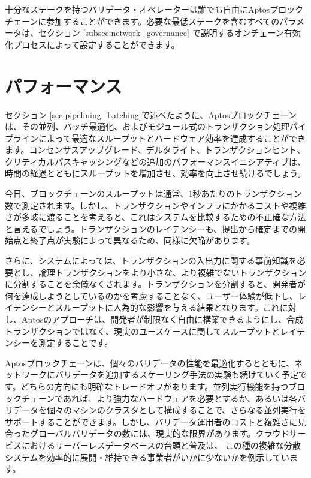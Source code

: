 \documentclass{article}
\begin{document}
十分なステークを持つバリデータ・オペレーターは誰でも自由にAptosブロックチェーンに参加することができます。必要な最低ステークを含むすべてのパラメータは、セクション \ref{subsec:network_governance} で説明するオンチェーン有効化プロセスによって設定することができます。

\section{パフォーマンス}
\label{sec:performance}

セクション \ref{sec:pipelining_batching}で述べたように、Aptosブロックチェーンは、その並列、バッチ最適化、およびモジュール式のトランザクション処理パイプラインによって最適なスループットとハードウェア効率を達成することができます。コンセンサスアップグレード、デルタライト、トランザクションヒント、クリティカルパスキャッシングなどの追加のパフォーマンスイニシアティブは、時間の経過とともにスループットを増加させ、効率を向上させ続けるでしょう。

今日、ブロックチェーンのスループットは通常、1秒あたりのトランザクション数で測定されます。しかし、トランザクションやインフラにかかるコストや複雑さが多岐に渡ることを考えると、これはシステムを比較するための不正確な方法と言えるでしょう。トランザクションのレイテンシーも、提出から確定までの開始点と終了点が実験によって異なるため、同様に欠陥があります。

さらに、システムによっては、トランザクションの入出力に関する事前知識を必要とし、論理トランザクションをより小さな、より複雑でないトランザクションに分割することを余儀なくされます。トランザクションを分割すると、開発者が何を達成しようとしているのかを考慮することなく、ユーザー体験が低下し、レイテンシーとスループットに人為的な影響を与える結果となります。これに対し、Aptosのアプローチは、開発者が制限なく自由に構築できるようにし、合成トランザクションではなく、現実のユースケースに関してスループットとレイテンシーを測定することです。

Aptosブロックチェーンは、個々のバリデータの性能を最適化するとともに、ネットワークにバリデータを追加するスケーリング手法の実験も続けていく予定です。どちらの方向にも明確なトレードオフがあります。並列実行機能を持つブロックチェーンであれば、より強力なハードウェアを必要とするか、あるいは各バリデータを個々のマシンのクラスタとして構成することで、さらなる並列実行をサポートすることができます。しかし、バリデータ運用者のコストと複雑さに見合ったグローバルバリデータの数には、現実的な限界があります。クラウドサービスにおけるサーバーレスデータベースの台頭と普及は、 この種の複雑な分散システムを効率的に展開・維持できる事業者がいかに少ないかを例示しています。
\end{document}
